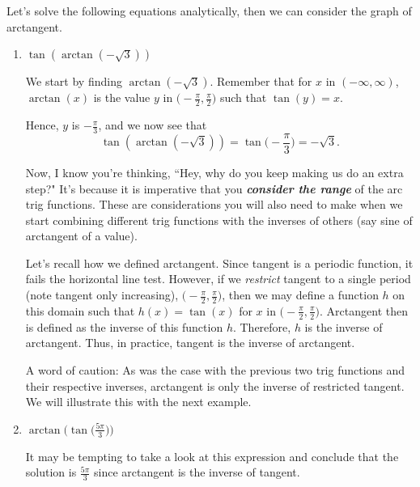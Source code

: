 \documentclass{ximera}
\begin{document}
\begin{example}
Let's solve the following equations analytically, then we can consider the graph of arctangent.	
\begin{enumerate}
%
\item $\tan(\arctan(-\sqrt{3}))$\\
\begin{explanation}
We start by finding $\arctan(-\sqrt{3})$. Remember that for $x$ in $(-\infty,\infty)$, $\arctan(x)$ is the value $y$ in $\Big(\!-\frac{\pi}{2},\frac{\pi}{2}\Big)$ such that $\tan(y) = x$. 

Hence, $y$ is $-\frac{\pi}{3}$, and we now see that 
\begin{equation*}
\tan(\arctan(-\sqrt{3})) = \tan\Big(\!-\frac{\pi}{3}\Big) = -\sqrt{3}.
\end{equation*}

Now, I know you're thinking, ``Hey, why do you keep making us do an extra step?" It's because it is imperative that you \textbf{\textit{consider the range}} of the arc trig functions. These are considerations you will also need to make when we start combining different trig functions with the inverses of others (say sine of arctangent of a value).

Let's recall how we defined arctangent. Since tangent is a periodic function, it fails the horizontal line test. However, if we {\it restrict} tangent to a single period (note tangent only increasing), $\Big(\!-\frac{\pi}{2},\frac{\pi}{2}\Big)$, then we may define a function $h$ on this domain such that $h(x) = \tan(x)$ for $x$ in $\Big(\!-\frac{\pi}{2},\frac{\pi}{2}\Big)$. Arctangent then is defined as the inverse of this function $h$. Therefore, $h$ is the inverse of arctangent. 
Thus, in practice, tangent is the inverse of arctangent. 

A word of caution: As was the case with the previous two trig functions and their respective inverses, arctangent is only the inverse of restricted tangent. We will illustrate this with the next example.
\end{explanation}


\item $\arctan\!\Big(\!\tan\!\Big(\frac{5\pi}{3}\Big)\Big)$

\begin{explanation}
It may be tempting to take a look at this expression and conclude that the solution is $\frac{5\pi}{3}$ since arctangent is the inverse of tangent. 


\end{explanation}
\end{enumerate}
\end{example}
\end{document}
